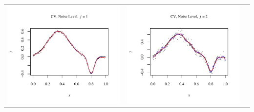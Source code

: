\documentclass[11pt]{article}
\begin{document}
\begin{table}[h]
  \begin{center}
    \renewcommand{\arraystretch}{1.5}
    \begin{tabular}{| >{\centering\arraybackslash}m{2.1in} |  >{\centering\arraybackslash}m{2.1in} |  >{\centering\arraybackslash}m{2.1in}|}
      \hline
      \includegraphics[width=1\linewidth,height=0.18\textheight]{Graphs/1/1/assignment5_a_1_1_1}&
      \includegraphics[width=1\linewidth,height=0.18\textheight]{Graphs/1/1/assignment5_a_1_1_2}&

\end{tabular}
\end{center}
\end{table}
\end{document}
